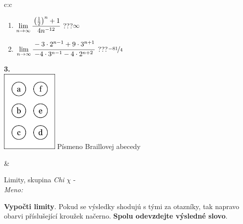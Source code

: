 \documentclass[10pt]{report}
\begin{document}
\begin{tabular}{c:c}
\begin{minipage}[c][104.5mm][t]{0.5\linewidth}
\begin{center}
\begin{minipage}{0.79\linewidth}
\begin{center}
\begin{varwidth}{\linewidth}
\begin{enumerate}
\item $\lim\limits_{n\to\infty}\cfrac{\left(\frac{1}{2}\right)^n +1}{4n^{-12}}$\quad \dotfill\; ???\;\dotfill \quad $\infty$
\item $\lim\limits_{n\to\infty}\cfrac{-3\cdot 2^{n-1}+9\cdot 3^{n+1}}{-4\cdot 3^{n-1}-4\cdot 2^{n+2}}$\quad \dotfill\; ???\;\dotfill \quad $\nicefrac{-81}{4}$
\end{enumerate}
\end{varwidth}
\end{center}
\end{minipage}
\begin{minipage}{0.20\linewidth}
\begin{center}
{\Huge\bfseries 3.} \\[2mm]
\includegraphics[height=40mm]{../images/braille.png}
{\small Písmeno Braillovej abecedy}
\end{center}
\end{minipage}
\end{center}
\end{minipage}
&
\begin{minipage}[c][104.5mm][t]{0.5\linewidth}
\begin{center}
\vspace{7mm}
{\huge Limity, skupina \textit{Chi $\chi$} -}\\[5mm]
\textit{Meno:}\phantom{xxxxxxxxxxxxxxxxxxxxxxxxxxxxxxxxxxxxxxxxxxxxxxxxxxxxxxxxxxxxxxxxx}\\[5mm]
\begin{minipage}{0.95\linewidth}
\begin{center}
\textbf{Vypočti limity}. Pokud se výsledky shodujú s tými za otazníky, tak napravo\\obarvi příslušející kroužek načerno. \textbf{Spolu odevzdejte výsledné slovo}.
\end{center}
\end{minipage}
\\[1mm]
\begin{minipage}{0.79\linewidth}
\begin{center}
\begin{varwidth}{\linewidth}

\end{varwidth}
\end{center}
\end{minipage}
\end{center}
\end{minipage}
\end{tabular}
\end{document}
